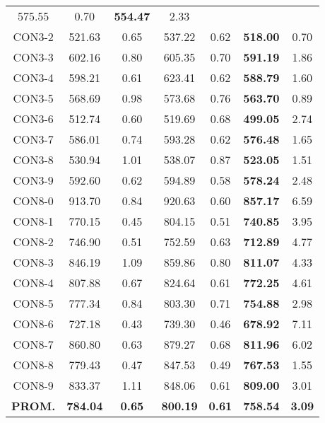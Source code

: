 \begin{table}[ht]
\begin{tabular}{c c c c c c c}
575.55 & 0.70 & \bf{554.47} & 
2.33\\CON3-2 & 521.63 & 0.65 & 
537.22 & 0.62 & \bf{518.00} & 
0.70\\CON3-3 & 602.16 & 0.80 & 
605.35 & 0.70 & \bf{591.19} & 
1.86\\CON3-4 & 598.21 & 0.61 & 
623.41 & 0.62 & \bf{588.79} & 
1.60\\CON3-5 & 568.69 & 0.98 & 
573.68 & 0.76 & \bf{563.70} & 
0.89\\CON3-6 & 512.74 & 0.60 & 
519.69 & 0.68 & \bf{499.05} & 
2.74\\CON3-7 & 586.01 & 0.74 & 
593.28 & 0.62 & \bf{576.48} & 
1.65\\CON3-8 & 530.94 & 1.01 & 
538.07 & 0.87 & \bf{523.05} & 
1.51\\CON3-9 & 592.60 & 0.62 & 
594.89 & 0.58 & \bf{578.24} & 
2.48\\CON8-0 & 913.70 & 0.84 & 
920.63 & 0.60 & \bf{857.17} & 
6.59\\CON8-1 & 770.15 & 0.45 & 
804.15 & 0.51 & \bf{740.85} & 
3.95\\CON8-2 & 746.90 & 0.51 & 
752.59 & 0.63 & \bf{712.89} & 
4.77\\CON8-3 & 846.19 & 1.09 & 
859.86 & 0.80 & \bf{811.07} & 
4.33\\CON8-4 & 807.88 & 0.67 & 
824.64 & 0.61 & \bf{772.25} & 
4.61\\CON8-5 & 777.34 & 0.84 & 
803.30 & 0.71 & \bf{754.88} & 
2.98\\CON8-6 & 727.18 & 0.43 & 
739.30 & 0.46 & \bf{678.92} & 
7.11\\CON8-7 & 860.80 & 0.63 & 
879.27 & 0.68 & \bf{811.96} & 
6.02\\CON8-8 & 779.43 & 0.47 & 
847.53 & 0.49 & \bf{767.53} & 
1.55\\CON8-9 & 833.37 & 1.11 & 
848.06 & 0.61 & \bf{809.00} & 
3.01\\\bf{PROM.} & 
\bf{784.04} & \bf{0.65} & \bf{800.19} & \bf{0.61} & \bf{758.54} & \bf{3.09}\\[1ex]\hline
\end{tabular}
\label{table:nonlin}
\end{table} \clearpage
